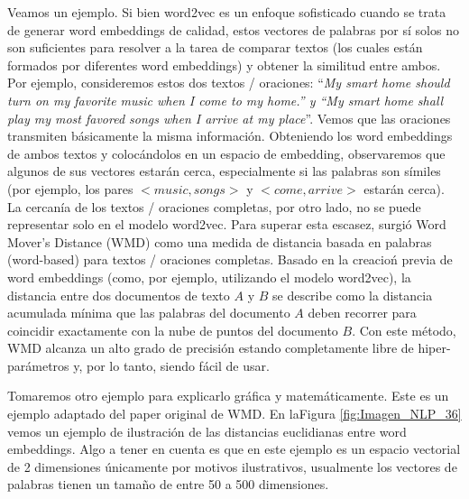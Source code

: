 \documentclass[12pt,a4paper]{article}
\begin{document}
\begin{sloppypar}
Veamos un ejemplo\cite{NLP_20}. Si bien word2vec es un enfoque sofisticado cuando se trata de generar word embeddings de calidad, estos vectores de palabras por sí solos no son suficientes para resolver a la tarea de comparar textos (los cuales están formados por diferentes word embeddings) y obtener la similitud entre ambos. Por ejemplo, consideremos estos dos textos / oraciones: “\textit{My smart home should turn on my favorite music when I come to my home.” y “My smart home shall play my most favored songs when I arrive at my place}”. Vemos que las oraciones transmiten básicamente la misma información. Obteniendo los word embeddings de ambos textos y colocándolos en un espacio de embedding, observaremos que algunos de sus vectores estarán cerca, especialmente si las palabras son símiles (por ejemplo, los pares $<music, songs>$  y  $<come, arrive>$  estarán cerca). La cercanía de los textos / oraciones completas,  por otro lado, no se puede representar solo en el modelo word2vec. Para superar esta escasez, surgió Word Mover's Distance (WMD) como una medida de distancia basada en palabras (word-based) para textos / oraciones completas. Basado en la creacioń previa de word embeddings (como, por ejemplo, utilizando el modelo word2vec), la distancia entre dos documentos de texto $A$ y $B$ se describe como la distancia acumulada mínima que las palabras del documento $A$ deben recorrer para coincidir exactamente con la nube de puntos del documento $B$. Con este método, WMD alcanza un alto grado de precisión estando completamente libre de hiper-parámetros y, por lo tanto, siendo fácil de usar.

Tomaremos otro ejemplo\cite{NLP_21} para explicarlo gráfica y matemáticamente. Este es un ejemplo adaptado del paper original de WMD\cite{wmd_paper}.  En laFigura \ref{fig:Imagen_NLP_36} vemos un ejemplo de ilustración de las distancias euclidianas entre word embeddings. Algo a tener en cuenta es que en este ejemplo es un espacio vectorial de 2 dimensiones únicamente por motivos ilustrativos, usualmente los vectores de palabras tienen un tamaño de entre 50 a 500 dimensiones.


\end{sloppypar}
\end{document}

